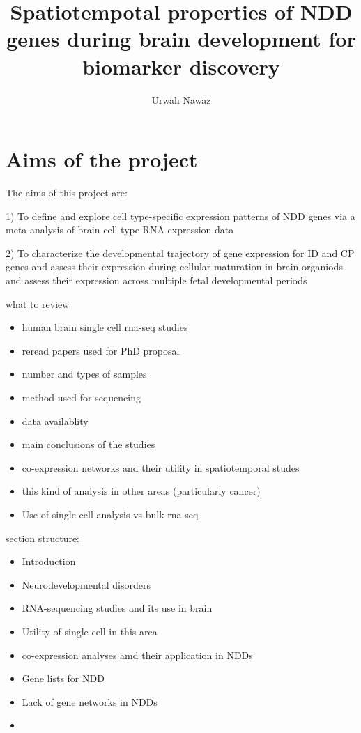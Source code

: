 \documentclass[12pt]{article}
\title{Spatiotempotal properties of NDD genes during brain development for biomarker discovery}
\author{Urwah Nawaz}
\begin{document}
\begin{titlepage}
    \maketitle
\end{titlepage}


\section{Aims of the project}

The aims of this project are: 

1) To define and explore cell type-specific expression patterns of NDD genes via a meta-analysis of brain cell type RNA-expression data 

2) To characterize the developmental trajectory of gene expression for ID and CP genes and assess their expression during cellular maturation in brain organiods and assess their expression across multiple fetal developmental periods

what to review

\begin{itemize}
    \item human brain single cell rna-seq studies 
    \item reread papers used for PhD proposal 
    \item number and types of samples 
    \item method used for sequencing 
    \item data availablity 
    \item main conclusions of the studies
    \item co-expression networks and their utility in spatiotemporal studes 
    \item this kind of analysis in other areas (particularly cancer)
    \item Use of single-cell analysis vs bulk rna-seq 
\end{itemize}

section structure: 
\begin{itemize}
    \item Introduction
    \item Neurodevelopmental disorders 
    \item RNA-sequencing studies and its use in brain 
    \item Utility of single cell in this area  
    \item co-expression analyses amd their application in NDDs
    \item Gene lists for NDD 
    \item Lack of gene networks in NDDs
    \item 
\end{itemize}
\end{document}
